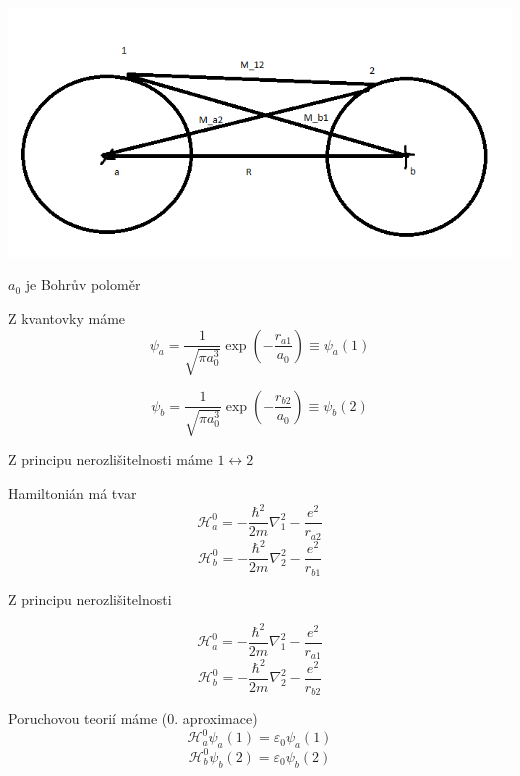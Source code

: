 \documentclass[../main.tex]{subfiles}
\begin{document}
\includegraphics[width=\linewidth]{images/kovalentni_vazba.png}

$a_0$ je Bohrův poloměr

Z kvantovky máme 
\begin{equation}
    \psi_a = \frac{1}{\sqrt{\pi a_{0}^3}} \exp \left(- \frac{r_{a1}}{a_0}\right) \equiv \psi_a(1)
\end{equation}

\begin{equation}
    \psi_b = \frac{1}{\sqrt{\pi a_{0}^3}} \exp \left(- \frac{r_{b2}}{a_0}\right) \equiv \psi_b(2)
\end{equation}

Z principu nerozlišitelnosti máme $1 \leftrightarrow 2$

Hamiltonián má tvar 
\begin{equation}
    \mathcal{H}_a^0 = - \frac{\hbar^2}{2m} \nabla_1^2 - \frac{e^2}{r_{a2}}
\end{equation}
\begin{equation}
    \mathcal{H}_b^0 = - \frac{\hbar^2}{2m} \nabla_2^2 - \frac{e^2}{r_{b1}}
\end{equation}

Z principu nerozlišitelnosti 

\begin{equation}
    \mathcal{H}_a^0 = - \frac{\hbar^2}{2m} \nabla_1^2 - \frac{e^2}{r_{a1}}
\end{equation}
\begin{equation}
    \mathcal{H}_b^0 = - \frac{\hbar^2}{2m} \nabla_2^2 - \frac{e^2}{r_{b2}}
\end{equation}


Poruchovou teorií máme (0. aproximace)
\begin{equation}
    \mathcal{H}_a^0 \psi_a(1)= \varepsilon_0 \psi_a(1) 
\end{equation}
\begin{equation}
    \mathcal{H}_b^0 \psi_b(2) = \varepsilon_0 \psi_b(2)
\end{equation}
\end{document}
